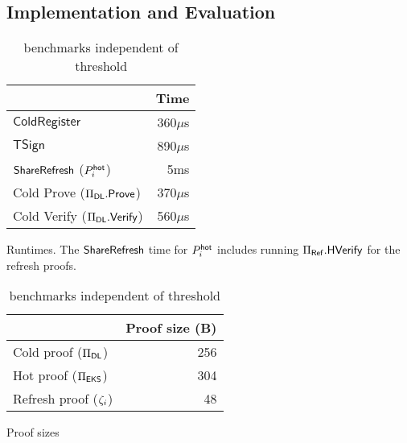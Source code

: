 \subsection{Implementation and Evaluation}\label{sec:eval}

\begin{table}[tb]
    \centering
    \setlength{\belowbottomsep}{0.5em}
    \begin{subtable}[t]{.5\linewidth}
        \centering
        \begin{tabular}{lr}
            \toprule
            &
            \textbf{Time} \\\midrule
            $\mathsf{ColdRegister}$ & 360$\mu$s \\
            $\mathsf{TSign}$ & 890$\mu$s \\ 
            $\mathsf{ShareRefresh}$ ($P_i^{\mathsf{hot}}$) & 5ms \\
            Cold Prove ($\Pi_{\sf DL}.\mathsf{Prove}$) & 370$\mu$s \\
            Cold Verify ($\Pi_{\sf DL}.{\mathsf{Verify}}$) & 560$\mu$s \\\bottomrule
        \end{tabular}
    \caption{Runtimes. The $\mathsf{ShareRefresh}$ time for $P_i^{\mathsf{hot}}$ includes running $\Pi_{\sf Ref}.{\sf H}{\mathsf{Verify}}$ for the refresh proofs.}\label{tab:bench-times}
    \end{subtable}%
    \begin{subtable}[t]{.5\linewidth}
        \centering
        \begin{tabular}{lr}
        \toprule
            & \textbf{Proof size} (B) \\\midrule
            Cold proof ($\Pi_{\sf DL}$) & 256 \\
            Hot proof ($\Pi_{\sf EKS}$) & 304 \\
            Refresh proof ($\zeta_i$) & 48 \\
            \bottomrule
        \end{tabular}%
        \caption{Proof sizes}\label{tab:bench-sizes}
    \end{subtable}
    \caption{\sysname benchmarks independent of threshold}
    \label{tab:bench}
\end{table}

